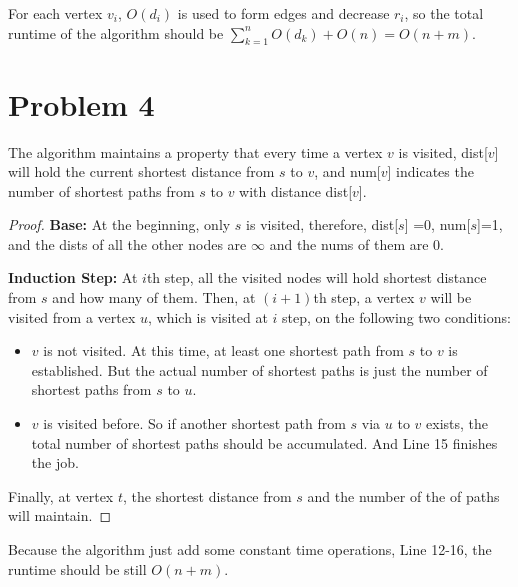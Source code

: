 \documentclass[letter,12pt]{article}
\begin{document}
For each vertex $v_i$, $O(d_i)$ is used to form edges and decrease 
$r_i$, so the total runtime of the algorithm should be 
$\sum\limits_{k=1}^n O(d_k) + O(n)= O(n+m)$.

\section*{Problem 4}
The algorithm maintains a property that every time a vertex $v$ is 
visited, dist[$v$] will hold the current shortest distance from $s$ to
$v$, and num[$v$] indicates the number of shortest paths from $s$
to $v$ with distance dist[$v$].

%

\begin{proof}
\textbf{Base:} At the beginning, only $s$ is visited, therefore, dist[$s$]
=0, num[$s$]=1, and the dists of all the other nodes are $\infty$ and
the nums of them are 0.

\textbf{Induction Step:} At $i$th step, all the visited nodes will hold 
shortest distance from $s$ and how many of them. Then, at $(i+1)$th 
step, a vertex $v$ will be visited from a vertex $u$, which is visited at 
$i$ step, on the following two conditions:

\begin{itemize}
    \item $v$ is not visited. At this time, at least one shortest path from
    $s$ to $v$ is established. But the actual number of shortest paths is
    just the number of shortest paths from $s$ to $u$.
    \item $v$ is visited before. So if another shortest path from $s$ via
    $u$ to $v$ exists, the total number of shortest paths should be 
    accumulated. And Line 15 finishes the job.
\end{itemize}

Finally, at vertex $t$, the shortest distance from $s$ and the number of
the of paths will maintain.
\end{proof}

Because the algorithm just add some constant time operations, Line 
12-16, the runtime should be still $O(n+m)$.
\end{document}
